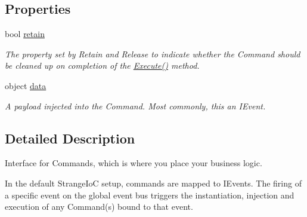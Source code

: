 \subsection*{Properties}
\begin{DoxyCompactItemize}
\item 
\hypertarget{interfacestrange_1_1extensions_1_1command_1_1api_1_1_i_command_ac69e1fd7542d521e9e04c24bc47791bb}{bool \hyperlink{interfacestrange_1_1extensions_1_1command_1_1api_1_1_i_command_ac69e1fd7542d521e9e04c24bc47791bb}{retain}}\label{interfacestrange_1_1extensions_1_1command_1_1api_1_1_i_command_ac69e1fd7542d521e9e04c24bc47791bb}

\begin{DoxyCompactList}\small\item\em The property set by {\ttfamily Retain} and {\ttfamily Release} to indicate whether the Command should be cleaned up on completion of the {\ttfamily \hyperlink{interfacestrange_1_1extensions_1_1command_1_1api_1_1_i_command_a49ddf3bbaf19624534fa99fa4725feca}{Execute()}} method. \end{DoxyCompactList}\item 
\hypertarget{interfacestrange_1_1extensions_1_1command_1_1api_1_1_i_command_afa2693fc9c9747093acde1dcab858570}{object \hyperlink{interfacestrange_1_1extensions_1_1command_1_1api_1_1_i_command_afa2693fc9c9747093acde1dcab858570}{data}}\label{interfacestrange_1_1extensions_1_1command_1_1api_1_1_i_command_afa2693fc9c9747093acde1dcab858570}

\begin{DoxyCompactList}\small\item\em A payload injected into the Command. Most commonly, this an I\-Event. \end{DoxyCompactList}\end{DoxyCompactItemize}


\subsection{Detailed Description}
Interface for Commands, which is where you place your business logic. 

In the default Strange\-Io\-C setup, commands are mapped to I\-Events. The firing of a specific event on the global event bus triggers the instantiation, injection and execution of any Command(s) bound to that event.

